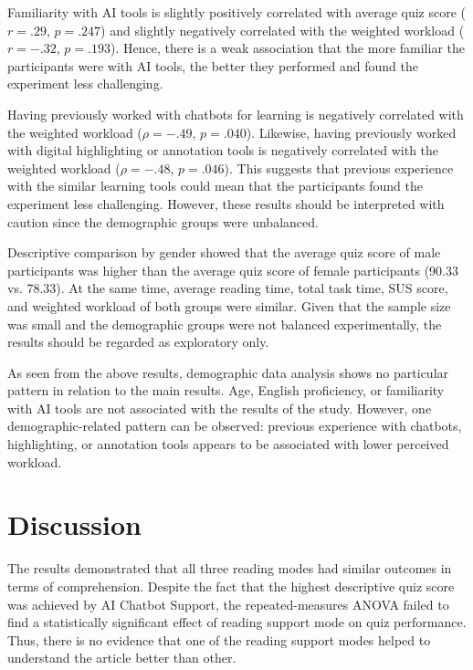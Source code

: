 \documentclass{IEEEtran}
\begin{document}
Familiarity with AI tools is slightly positively correlated with average quiz score ($r=.29$, $p=.247$) and slightly negatively correlated with the weighted workload ($r=-.32$, $p=.193$). Hence, there is a weak association that the more familiar the participants were with AI tools, the better they performed and found the experiment less challenging.

Having previously worked with chatbots for learning is negatively correlated with the weighted workload ($\rho=-.49$, $p=.040$). Likewise, having previously worked with digital highlighting or annotation tools is negatively correlated with the weighted workload ($\rho=-.48$, $p=.046$). This suggests that previous experience with the similar learning tools could mean that the participants found the experiment less challenging. However, these results should be interpreted with caution since the demographic groups were unbalanced.

Descriptive comparison by gender showed that the average quiz score of male participants was higher than the average quiz score of female participants (90.33 vs. 78.33). At the same time, average reading time, total task time, SUS score, and weighted workload of both groups were similar. Given that the sample size was small and the demographic groups were not balanced experimentally, the results should be regarded as exploratory only.

As seen from the above results, demographic data analysis shows no particular pattern in relation to the main results. Age, English proficiency, or familiarity with AI tools are not associated with the results of the study. However, one demographic-related pattern can be observed: previous experience with chatbots, highlighting, or annotation tools appears to be associated with lower perceived workload.



\section{Discussion}

The results demonstrated that all three reading modes had similar outcomes in terms of comprehension. Despite the fact that the highest descriptive quiz score was achieved by AI Chatbot Support, the repeated-measures ANOVA failed to find a statistically significant effect of reading support mode on quiz performance. Thus, there is no evidence that one of the reading support modes helped to understand the article better than other.
\end{document}
